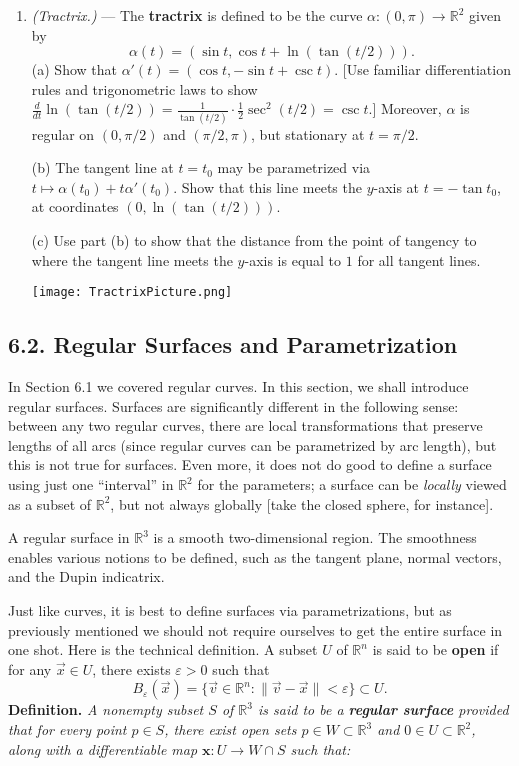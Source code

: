 \documentclass[leqno]{book}
\begin{document}
\begin{enumerate}
\item\emph{(Tractrix.)} \---- The \textbf{tractrix} is defined to be the curve $\alpha:(0,\pi)\to\mathbb R^2$ given by
$$\alpha(t)=(\sin t,\cos t+\ln(\tan(t/2))).$$
(a) Show that $\alpha'(t)=(\cos t,-\sin t+\csc t)$. [Use familiar differentiation rules and trigonometric laws to show $\frac{d}{dt}\ln(\tan(t/2))=\frac 1{\tan(t/2)}\cdot\frac 12\sec^2(t/2)=\csc t$.]  Moreover, $\alpha$ is regular on $(0,\pi/2)$ and $(\pi/2,\pi)$, but stationary at $t=\pi/2$.

(b) The tangent line at $t=t_0$ may be parametrized via $t\mapsto\alpha(t_0)+t\alpha'(t_0)$.  Show that this line meets the $y$-axis at $t=-\tan t_0$, at coordinates $(0,\ln(\tan(t/2)))$.

(c) Use part (b) to show that the distance from the point of tangency to where the tangent line meets the $y$-axis is equal to $1$ for all tangent lines.

\begin{center}
\texttt{[image: TractrixPicture.png]}
\end{center}
\end{enumerate}

\subsection*{6.2. Regular Surfaces and Parametrization}
In Section 6.1 we covered regular curves.  In this section, we shall introduce regular surfaces.  Surfaces are significantly different in the following sense: between any two regular curves, there are local transformations that preserve lengths of all arcs (since regular curves can be parametrized by arc length), but this is not true for surfaces.  Even more, it does not do good to define a surface using just one ``interval'' in $\mathbb R^2$ for the parameters; a surface can be \emph{locally} viewed as a subset of $\mathbb R^2$, but not always globally [take the closed sphere, for instance].

A regular surface in $\mathbb R^3$ is a smooth two-dimensional region.  The smoothness enables various notions to be defined, such as the tangent plane, normal vectors, and the Dupin indicatrix.

Just like curves, it is best to define surfaces via parametrizations, but as previously mentioned we should not require ourselves to get the entire surface in one shot.  Here is the technical definition.  A subset $U$ of $\mathbb R^n$ is said to be \textbf{open} if for any $\vec x\in U$, there exists $\varepsilon>0$ such that
$$B_{\varepsilon}(\vec x)=\{\vec v\in\mathbb R^n:\|\vec v-\vec x\|<\varepsilon\}\subset U.$$
\noindent\textbf{Definition.} \emph{A nonempty subset $S$ of $\mathbb R^3$ is said to be a \textbf{regular surface} provided that for every point $p\in S$, there exist open sets $p\in W\subset\mathbb R^3$ and $0\in U\subset\mathbb R^2$, along with a differentiable map $\mathbf x:U\to W\cap S$ such that:}
\end{document}
